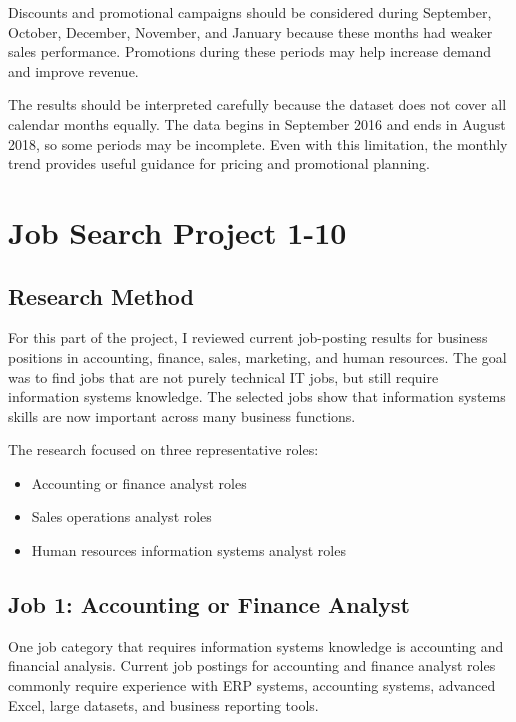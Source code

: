 \documentclass[12pt]{article}
\begin{document}
Discounts and promotional campaigns should be considered during September,
October, December, November, and January because these months had weaker sales
performance. Promotions during these periods may help increase demand and improve
revenue.

The results should be interpreted carefully because the dataset does not cover
all calendar months equally. The data begins in September 2016 and ends in August
2018, so some periods may be incomplete. Even with this limitation, the monthly
trend provides useful guidance for pricing and promotional planning.


\section{Job Search Project 1-10}

\subsection{Research Method}

For this part of the project, I reviewed current job-posting results for business
positions in accounting, finance, sales, marketing, and human resources. The goal
was to find jobs that are not purely technical IT jobs, but still require
information systems knowledge. The selected jobs show that information systems
skills are now important across many business functions.

The research focused on three representative roles:

\begin{itemize}
    \item Accounting or finance analyst roles
    \item Sales operations analyst roles
    \item Human resources information systems analyst roles
\end{itemize}


\subsection{Job 1: Accounting or Finance Analyst}

One job category that requires information systems knowledge is accounting and
financial analysis. Current job postings for accounting and finance analyst roles
commonly require experience with ERP systems, accounting systems, advanced Excel,
large datasets, and business reporting tools.
\end{document}

